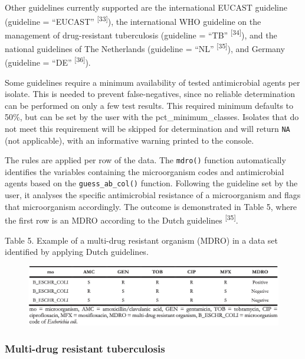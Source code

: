 \documentclass[
]{book}
\begin{document}
Other guidelines currently supported are the international EUCAST guideline (guideline = ``EUCAST'' \textsuperscript{{[}33{]}}), the international WHO guideline on the management of drug-resistant tuberculosis (guideline = ``TB'' \textsuperscript{{[}34{]}}), and the national guidelines of The Netherlands (guideline = ``NL'' \textsuperscript{{[}35{]}}), and Germany (guideline = ``DE'' \textsuperscript{{[}36{]}}).

Some guidelines require a minimum availability of tested antimicrobial agents per isolate. This is needed to prevent false-negatives, since no reliable determination can be performed on only a few test results. This required minimum defaults to 50\%, but can be set by the user with the pct\_minimum\_classes. Isolates that do not meet this requirement will be skipped for determination and will return \texttt{NA} (not applicable), with an informative warning printed to the console.

The rules are applied per row of the data. The \texttt{mdro()} function automatically identifies the variables containing the microorganism codes and antimicrobial agents based on the \texttt{guess\_ab\_col()} function. Following the guideline set by the user, it analyses the specific antimicrobial resistance of a microorganism and flags that microorganism accordingly. The outcome is demonstrated in Table 5, where the first row is an MDRO according to the Dutch guidelines \textsuperscript{{[}35{]}}.

Table 5. Example of a multi-drug resistant organism (MDRO) in a data set identified by applying Dutch guidelines.

\begin{figure}

{\centering \includegraphics[width=1\linewidth]{images/04-t05} 

}

\end{figure}

\hypertarget{multi-drug-resistant-tuberculosis}{%
\subsubsection{Multi-drug resistant tuberculosis}\label{multi-drug-resistant-tuberculosis}}
\end{document}
